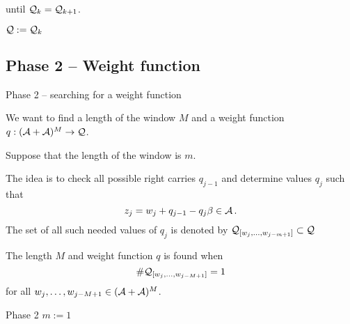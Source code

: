       until $\mathcal{Q}_k = \mathcal{Q}_{k+1}$.
      
      
      \vspace{7pt}
      $\mathcal{Q}:=\mathcal{Q}_k$
    





\subsection{Phase 2 -- Weight function}

    {Phase 2 -- searching for a weight function}

    We want to find a length of the window $M$ and a weight function $q:(\mathcal{A}+\mathcal{A})^{M} \to \mathcal{Q}$.%
    
    
    Suppose that the length of the window is $m$.
    
    The idea is to check all possible right carries $q_{j-1}$ and determine values $q_j$ such that 
    $$
    z_j=w_j + q_{j-1} - q_j \beta \in \mathcal{A} \,.
    $$
    The set of all such needed values of $q_j$ is denoted by $\mathcal{Q}_{[w_{j},\dots, w_{j-m+1}]}\subset \mathcal{Q}$
        
    
    The length $M$ and weight function $q$ is found when 
    $$
    \#\mathcal{Q}_{[w_{j},\dots, w_{j-M+1}]}=1
    $$
    for all $w_{j},\dots, w_{j-M+1} \in (\mathcal{A}+\mathcal{A})^M$.
    



    {Phase 2}
      $m:=1$
      
